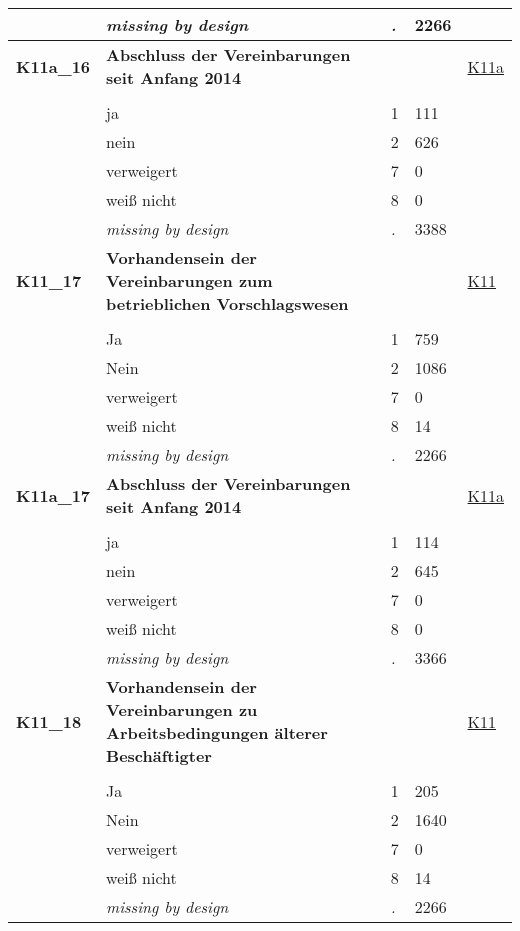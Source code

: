 \begin{longtable}{| L{2.65cm} | L{8cm} | C{1.5cm} | R{1.25cm} | C{2.25cm}  |}
   & \textit{missing by design} & \textit{.} & 2266 &  \\ 
   \midrule
\textbf{K11a\_16}\label{var:K11a:16} & \textbf{Abschluss der Vereinbarungen seit Anfang 2014} &  &  & \hyperref[K11a]{K11a} \\ 
   &  &  &  &  \\ 
   & ja & 1 & 111 &  \\ 
   & nein & 2 & 626 &  \\ 
   & verweigert & 7 & 0 &  \\ 
   & weiß nicht & 8 & 0 &  \\ 
   & \textit{missing by design} & \textit{.} & 3388 &  \\ 
   \midrule
\textbf{K11\_17}\label{var:K11:17} & \textbf{Vorhandensein der Vereinbarungen zum betrieblichen Vorschlagswesen} &  &  & \hyperref[K11]{K11} \\ 
   &  &  &  &  \\ 
   & Ja & 1 & 759 &  \\ 
   & Nein & 2 & 1086 &  \\ 
   & verweigert & 7 & 0 &  \\ 
   & weiß nicht & 8 & 14 &  \\ 
   & \textit{missing by design} & \textit{.} & 2266 &  \\ 
   \midrule
\textbf{K11a\_17}\label{var:K11a:17} & \textbf{Abschluss der Vereinbarungen seit Anfang 2014} &  &  & \hyperref[K11a]{K11a} \\ 
   &  &  &  &  \\ 
   & ja & 1 & 114 &  \\ 
   & nein & 2 & 645 &  \\ 
   & verweigert & 7 & 0 &  \\ 
   & weiß nicht & 8 & 0 &  \\ 
   & \textit{missing by design} & \textit{.} & 3366 &  \\ 
   \midrule
\textbf{K11\_18}\label{var:K11:18} & \textbf{Vorhandensein der Vereinbarungen zu Arbeitsbedingungen älterer Beschäftigter} &  &  & \hyperref[K11]{K11} \\ 
   &  &  &  &  \\ 
   & Ja & 1 & 205 &  \\ 
   & Nein & 2 & 1640 &  \\ 
   & verweigert & 7 & 0 &  \\ 
   & weiß nicht & 8 & 14 &  \\ 
   & \textit{missing by design} & \textit{.} & 2266 &  \\ 

\end{longtable}
